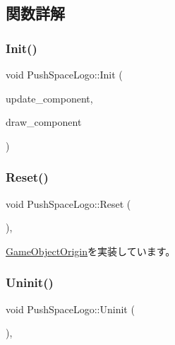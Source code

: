\subsection{関数詳解}
\mbox{\label{class_push_space_logo_af22e94b451e42a581396b9f0e8b9b15b}} 
\subsubsection{\texorpdfstring{Init()}{Init()}}
{\footnotesize\ttfamily void Push\+Space\+Logo\+::\+Init (\begin{DoxyParamCaption}\item[{\mbox{\hyperlink{class_update_component}{Update\+Component}} $\ast$}]{update\+\_\+component,  }\item[{\mbox{\hyperlink{class_draw_component}{Draw\+Component}} $\ast$}]{draw\+\_\+component }\end{DoxyParamCaption})}

\mbox{\label{class_push_space_logo_afa163b1aff8df494b4f09f378bf983f0}} 
\subsubsection{\texorpdfstring{Reset()}{Reset()}}
{\footnotesize\ttfamily void Push\+Space\+Logo\+::\+Reset (\begin{DoxyParamCaption}{ }\end{DoxyParamCaption})\hspace{0.3cm}{\ttfamily [override]}, {\ttfamily [virtual]}}



\mbox{\hyperlink{class_game_object_origin_af9af378a4fd9028316a6fdb461ed6a10}{Game\+Object\+Origin}}を実装しています。

\mbox{\label{class_push_space_logo_a06404113db417c58941ca7a13bba161e}} 
\subsubsection{\texorpdfstring{Uninit()}{Uninit()}}
{\footnotesize\ttfamily void Push\+Space\+Logo\+::\+Uninit (\begin{DoxyParamCaption}{ }\end{DoxyParamCaption})\hspace{0.3cm}{\ttfamily [override]}, {\ttfamily [virtual]}}



